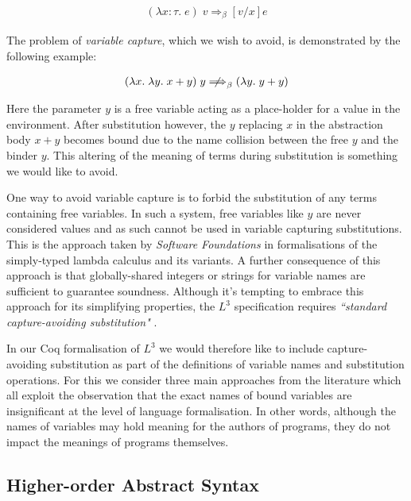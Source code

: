 \documentclass[]{unswthesis}
\begin{document}
\begin{eqnarray*}
(\lambda x : \tau. \; e) \; v \Longrightarrow_\beta [v/x]e
\end{eqnarray*}

The problem of \textit{variable capture}, which we wish to avoid, is demonstrated by the following example:

\begin{eqnarray*}
(\lambda x. \; \lambda y. \; x + y) \; y \; {\centernot\Longrightarrow}_\beta \; (\lambda y. \; y + y)
\end{eqnarray*}

Here the parameter $y$ is a free variable acting as a place-holder for a value in the environment. After substitution however, the $y$ replacing $x$ in the abstraction body $x + y$ becomes bound due to the name collision between the free $y$ and the binder $y$. This altering of the meaning of terms during substitution is something we would like to avoid.

One way to avoid variable capture is to forbid the substitution of any terms containing free variables. In such a system, free variables like $y$ are never considered values and as such cannot be used in variable capturing substitutions. This is the approach taken by \textit{Software Foundations} \cite{pierce15} in formalisations of the simply-typed lambda calculus and its variants. A further consequence of this approach is that globally-shared integers or strings for variable names are sufficient to guarantee soundness. Although it's tempting to embrace this approach for its simplifying properties, the $L^3$ specification requires \textit{``standard capture-avoiding substitution"} \cite{ahmed05}.


In our Coq formalisation of $L^3$ we would therefore like to include capture-avoiding substitution as part of the definitions of variable names and substitution operations. For this we consider three main approaches from the literature which all exploit the observation that the exact names of bound variables are insignificant at the level of language formalisation. In other words, although the names of variables may hold meaning for the authors of programs, they do not impact the meanings of programs themselves.

\subsection{Higher-order Abstract Syntax}
\end{document}
